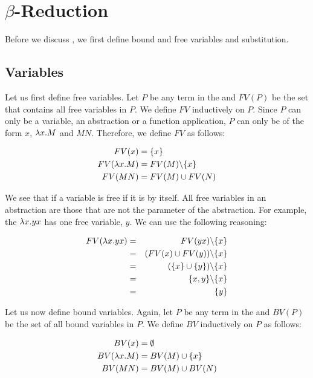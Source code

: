 \section{\texorpdfstring{\boldmath${\beta}$-Reduction}{Beta Reduction}}
Before we discuss \br, we first define bound and free variables and substitution.

\subsection{Variables}
Let us first define free variables. 
Let $P$ be any term in the \lc and $FV(P)$ be the set that contains all free variables in $P$. We define $FV$ inductively on $P$.
Since $P$ can only be a variable, an abstraction or a function application, $P$ can only be of the form $x$, $\lambda {x}.{M}$ and $M N$.
Therefore, we define $FV$ as follows:

\begin{align*}
	FV(x)           &= \{x\} \\
	FV(\lambda {x}.{M}) &= FV(M) \backslash \{x\} \\
	FV(M N)         &= FV(M) \cup FV(N)
\end{align*}

We see that if a variable is free if it is by itself. All free variables in an abstraction are those that are not the parameter of the abstraction.
For example, the \lterm $\lambda {x}.{yx}$ has one free variable, $y$. We can use the following reasoning:

\begin{eqnarray*}
	FV(\lambda {x}.{yx}) &=& FV(y x) \backslash \{x\} \\
	&=& (FV(x) \cup FV(y)) \backslash \{x\} \\
	&=& (\{x\} \cup \{y\}) \backslash \{x\} \\
	&=& \{x, y\} \backslash \{x\} \\
	&=& \{y\}
\end{eqnarray*}

Let us now define bound variables. Again, let $P$ be any term in the \lc and $BV(P)$ be the set of all bound variables in $P$. 
We define $BV$ inductively on $P$ as follows:

\begin{align*}
	BV(x)           &= \emptyset \\
	BV(\lambda {x}.{M}) &= BV(M) \cup \{x\} \\
	BV(M N)         &= BV(M) \cup BV(N)
\end{align*}

